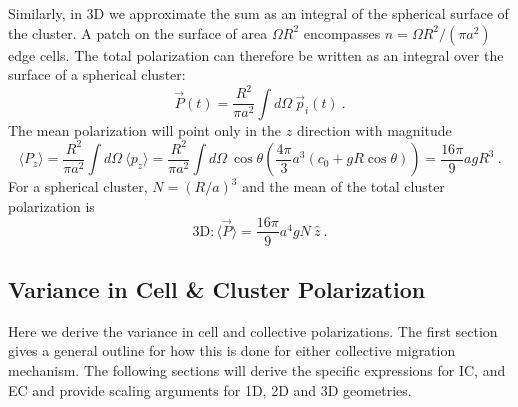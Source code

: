 Similarly, in 3D we approximate the sum as an integral of the spherical surface of the cluster. A patch on the surface of area $\Omega R^2$ encompasses
$n = \Omega R^2 / (\pi a^2)$ edge cells. The total polarization can therefore be written as an integral over the surface of a spherical cluster:
\begin{equation}
    \vec{P}(t) = \frac{R^2}{\pi a^2} \int d\Omega \ \vec{p}_i(t) \ .
\end{equation}
The mean polarization will point only in the $z$ direction with magnitude
\begin{equation*}
    \langle P_z \rangle = \frac{R^2}{\pi a^2} \int d\Omega \ \langle p_z \rangle = \frac{R^2}{\pi a^2} \int d\Omega \ \cos\theta \left( \frac{4\pi}{3}a^3 (c_0+gR\cos\theta) \right) = \frac{16\pi}{9} agR^3 \ .
\end{equation*}
For a spherical cluster, $N = (R/a)^3$ and the mean of the total cluster polarization is
\begin{equation} \label{eq:3DECmean}
    \text{3D}: \langle\vec{P}\rangle = \frac{16\pi}{9} a^4gN \ \hat{z} \ .
\end{equation}


\subsection{Variance in Cell \& Cluster Polarization}

Here we derive the variance in cell and collective polarizations. The first section gives a general outline for how this is done for either collective migration mechanism. The following sections will derive the specific expressions for IC, and EC and provide scaling arguments for 1D, 2D and 3D geometries.



